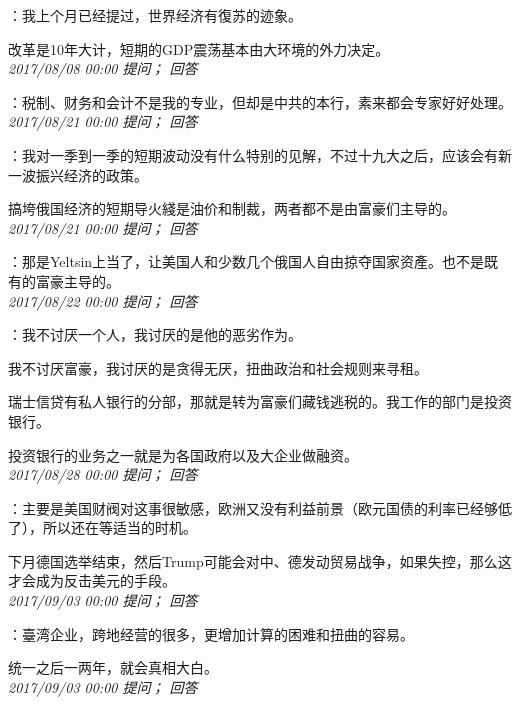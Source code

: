 \documentclass[twocolumn]{ctexart}
\begin{document}
：我上个月已经提过，世界经济有復苏的迹象。

改革是10年大计，短期的GDP震荡基本由大环境的外力决定。\\

\textit{\hfill\noindent\small 2017/08/08 00:00 提问； 回答}

：税制、财务和会计不是我的专业，但却是中共的本行，素来都会专家好好处理。\\

\textit{\hfill\noindent\small 2017/08/21 00:00 提问； 回答}

：我对一季到一季的短期波动没有什么特别的见解，不过十九大之后，应该会有新一波振兴经济的政策。

搞垮俄国经济的短期导火綫是油价和制裁，两者都不是由富豪们主导的。
\\

\textit{\hfill\noindent\small 2017/08/21 00:00 提问； 回答}

：那是Yeltsin上当了，让美国人和少数几个俄国人自由掠夺国家资產。也不是既有的富豪主导的。\\

\textit{\hfill\noindent\small 2017/08/22 00:00 提问； 回答}

：我不讨厌一个人，我讨厌的是他的恶劣作为。

我不讨厌富豪，我讨厌的是贪得无厌，扭曲政治和社会规则来寻租。

瑞士信贷有私人银行的分部，那就是转为富豪们藏钱逃税的。我工作的部门是投资银行。

投资银行的业务之一就是为各国政府以及大企业做融资。\\

\textit{\hfill\noindent\small 2017/08/28 00:00 提问； 回答}

：主要是美国财阀对这事很敏感，欧洲又没有利益前景（欧元国债的利率已经够低了），所以还在等适当的时机。

下月德国选举结束，然后Trump可能会对中、德发动贸易战争，如果失控，那么这才会成为反击美元的手段。\\

\textit{\hfill\noindent\small 2017/09/03 00:00 提问； 回答}

：臺湾企业，跨地经营的很多，更增加计算的困难和扭曲的容易。

统一之后一两年，就会真相大白。\\

\textit{\hfill\noindent\small 2017/09/03 00:00 提问； 回答}
\end{document}
